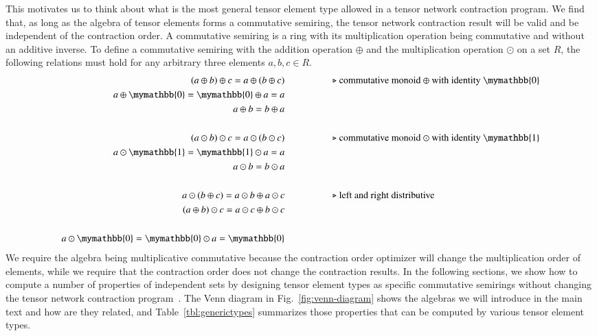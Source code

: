 \documentclass[onefignum, onetabnum]{siamart190516}
\newcommand{\<}{\langle}
\renewcommand{\>}{\rangle}
\newcommand{\Fig}[1]{Fig.~\ref{#1}}
\begin{document}
This motivates us to think about what is the most general tensor element type allowed in a tensor network contraction program.
We find that, as long as the algebra of tensor elements forms a commutative semiring, the tensor network contraction result will be valid and be independent of the contraction order.
A commutative semiring is a ring with its multiplication operation being commutative and without an additive inverse.
To define a commutative semiring with the addition operation $\oplus$ and the multiplication operation $\odot$ on a set $R$, the following relations must hold for any arbitrary three elements $a, b, c \in R$.
\begin{align*}
(a \oplus b) \oplus c = a \oplus (b \oplus c) & \hspace{5em}\text{$\triangleright$ commutative monoid $\oplus$ with identity $\mymathbb{0}$}\\
a \oplus \mymathbb{0} = \mymathbb{0} \oplus a = a &\\
a \oplus b = b \oplus a &\\
&\\
(a \odot b) \odot c = a \odot (b \odot c)  &   \hspace{5em}\text{$\triangleright$ commutative monoid $\odot$ with identity $\mymathbb{1}$}\\
a \odot  \mymathbb{1} =  \mymathbb{1} \odot a = a &\\
a \odot b = b \odot a &\\
&\\
a \odot (b\oplus c) = a\odot b \oplus a\odot c  &  \hspace{5em}\text{$\triangleright$ left and right distributive}\\
(a\oplus b) \odot c = a\odot c \oplus b\odot c &\\
&\\
a \odot \mymathbb{0} = \mymathbb{0} \odot a = \mymathbb{0}
\end{align*}
We require the algebra being multiplicative commutative because the contraction order optimizer will change the multiplication order of elements, while we require that the contraction order does not change the contraction results.
In the following sections, we show how to compute a number of properties of independent sets by designing tensor element types as specific commutative semirings without changing the tensor network contraction program~\cite{Stepanov2014}.
The Venn diagram in \Fig{fig:venn-diagram} shows the algebras we will introduce in the main text and how are they related, and Table~\ref{tbl:generictypes} summarizes those properties that can be computed by various tensor element types.
\end{document}
